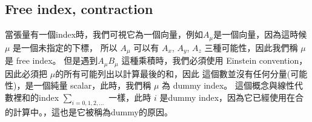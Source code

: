 \documentclass[letterpaper,10pt,english]{jupyterBook}
\begin{document}
\subsection{Free index, contraction}
\label{\detokenize{va/vec_alge:free-index-contraction}}
\sphinxAtStartPar
當張量有一個index時，我們可視它為一個向量，例如\(A_\mu\)是一個向量，因為這時候 \(\mu\) 是一個未指定的下標，
所以 \(A_\mu\) 可以有 \(A_x\), \(A_y\), \(A_z\) 三種可能性，因此我們稱 \(\mu\) 是 free index。
但是遇到\(A_\mu B_\mu\) 這種乘積時，我們必須使用 Einstein convention，因此必須把 \(\mu\)的所有可能列出以計算最後的和，因此  這個數並沒有任何分量(可能性)，是一個純量 scalar，此時，我們稱 \(\mu\) 為 dummy index。 這個概念與線性代數裡和的index \(\sum_{i=0,1,2,...}\) 一樣，此時 \(i\) 是dummy index，因為它已經使用在合的計算中。，這也是它被稱為dummy的原因。
\end{document}
